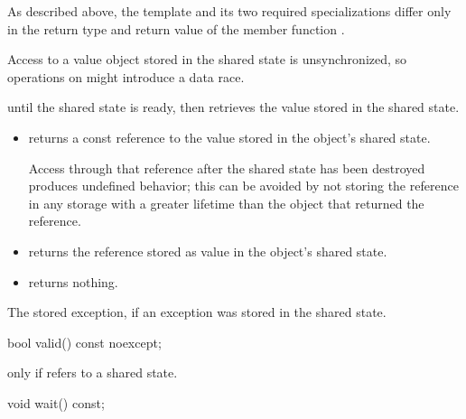\begin{itemdescr}
\pnum
\begin{note}
As described above, the template and its two required specializations differ only in
the return type and return value of the member function .
\end{note}

\pnum
\begin{note}
Access to a value object stored in the shared state is
unsynchronized, so operations on  might
introduce a data race.
\end{note}

\pnum
\effects
{} until the shared state is ready, then retrieves the
value stored in the shared state.

\pnum
\returns
\begin{itemize}
\item
{} returns a const reference to the value stored in the object's
shared state.
\begin{note}
Access through that reference after the shared state has been
destroyed produces undefined behavior; this can be avoided by not storing the reference in any
storage with a greater lifetime than the  object that returned the
reference.
\end{note}

\item
{} returns the reference stored as value in the object's
shared state.

\item
{} returns nothing.
\end{itemize}

\pnum
\throws
The stored exception, if an exception was stored in the shared state.
\end{itemdescr}

%
\begin{itemdecl}
bool valid() const noexcept;
\end{itemdecl}

\begin{itemdescr}
\pnum
\returns
{} only if  refers to a shared state.
\end{itemdescr}

%
\begin{itemdecl}
void wait() const;
\end{itemdecl}

